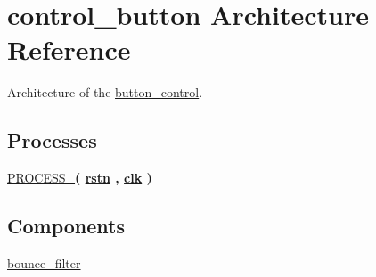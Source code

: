 \hypertarget{classbutton__control_1_1control__button}{\section{control\-\_\-button Architecture Reference}
\label{classbutton__control_1_1control__button}
}


Architecture of the \hyperlink{classbutton__control}{button\-\_\-control}.  


\subsection*{Processes}
 \begin{DoxyCompactItemize}
\item 
\hypertarget{classbutton__control_1_1control__button_a6824e9b2c53c03ada87de6293f641498}{\hyperlink{classbutton__control_1_1control__button_a6824e9b2c53c03ada87de6293f641498}{P\-R\-O\-C\-E\-S\-S\-\_}{\bfseries  ( {\bfseries {\bfseries \hyperlink{classbutton__control_aba021aec4b477b89079bb58ccadcc67e}{rstn}} \textcolor{vhdlchar}{ }\textcolor{vhdlchar}{ }\textcolor{vhdlchar}{ }} , {\bfseries {\bfseries \hyperlink{classbutton__control_a8120037e0ee47c35ba2d79242209c72e}{clk}} \textcolor{vhdlchar}{ }} )}}\label{classbutton__control_1_1control__button_a6824e9b2c53c03ada87de6293f641498}

\end{DoxyCompactItemize}
\subsection*{Components}
 \begin{DoxyCompactItemize}
\item 
\hypertarget{classbutton__control_1_1control__button_a3984c4f45c218611ebbd166fc1fc6a67}{\hyperlink{classbutton__control_1_1control__button_a3984c4f45c218611ebbd166fc1fc6a67}{bounce\-\_\-filter}  {\bfseries }  }\label{classbutton__control_1_1control__button_a3984c4f45c218611ebbd166fc1fc6a67}

\end{DoxyCompactItemize}
